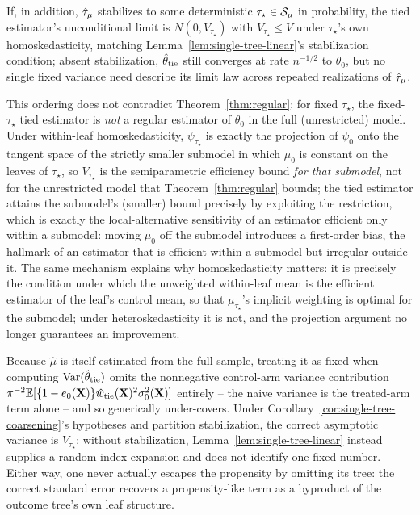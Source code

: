 \documentclass[12pt]{article}
\begin{document}
\begin{corollary}
If, in addition, $\hat{\tau}_\mu$ stabilizes to some deterministic $\tau_\star\in\mathcal{S}_\mu$ in probability, the tied estimator's unconditional limit is $N(0,V_{\tau_\star})$ with $V_{\tau_\star}\le V$ under $\tau_\star$'s own homoskedasticity, matching Lemma~\ref{lem:single-tree-linear}'s stabilization condition; absent stabilization, $\hat{\theta}_{\mathrm{tie}}$ still converges at rate $n^{-1/2}$ to $\theta_0$, but no single fixed variance need describe its limit law across repeated realizations of $\hat{\tau}_\mu$.

This ordering does not contradict Theorem~\ref{thm:regular}: for fixed $\tau_\star$, the fixed-$\tau_\star$ tied estimator is \emph{not} a regular estimator of $\theta_0$ in the full (unrestricted) model. Under within-leaf homoskedasticity, $\psi_{\tau_\star}$ is exactly the projection of $\psi_0$ onto the tangent space of the strictly smaller submodel in which $\mu_0$ is constant on the leaves of $\tau_\star$, so $V_{\tau_\star}$ is the semiparametric efficiency bound \emph{for that submodel}, not for the unrestricted model that Theorem~\ref{thm:regular} bounds; the tied estimator attains the submodel's (smaller) bound precisely by exploiting the restriction, which is exactly the local-alternative sensitivity of an estimator efficient only within a submodel: moving $\mu_0$ off the submodel introduces a first-order bias, the hallmark of an estimator that is efficient within a submodel but irregular outside it. The same mechanism explains why homoskedasticity matters: it is precisely the condition under which the unweighted within-leaf mean is the efficient estimator of the leaf's control mean, so that $\mu_{\tau_\star}$'s implicit weighting is optimal for the submodel; under heteroskedasticity it is not, and the projection argument no longer guarantees an improvement.
\end{corollary}

\begin{remark}
\label{rem:single-tree-se}
Because $\hat\mu$ is itself estimated from the full sample, treating it as fixed when computing $\operatorname{Var}(\hat{\theta}_{\mathrm{tie}})$ omits the nonnegative control-arm variance contribution $\pi^{-2}\mathbb{E}[\{1-e_0(\mathbf{X})\}\hat w_{\mathrm{tie}}(\mathbf{X})^2\sigma_0^2(\mathbf{X})]$ entirely -- the naive variance is the treated-arm term alone -- and so generically under-covers. Under Corollary~\ref{cor:single-tree-coarsening}'s hypotheses and partition stabilization, the correct asymptotic variance is $V_{\tau_\star}$; without stabilization, Lemma~\ref{lem:single-tree-linear} instead supplies a random-index expansion and does not identify one fixed number. Either way, one never actually escapes the propensity by omitting its tree: the correct standard error recovers a propensity-like term as a byproduct of the outcome tree's own leaf structure.
\end{remark}
\end{document}
